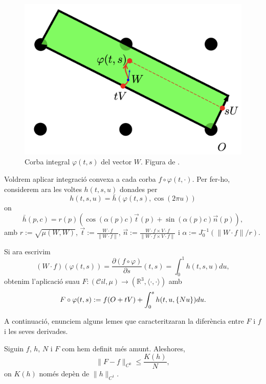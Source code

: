 \begin{figure}[htbp]
    \centering
    \includegraphics[height=0.33\textwidth]{W.png}
    \caption{Corba integral $\varphi(t,s)$ del vector $W$. Figura de \citet{borrelli2013}.}
    \label{fig:vuitena_foto}
\end{figure}

Voldrem aplicar integració convexa a cada corba $f\circ\varphi(t,\cdot)$. Per fer-ho, considerem ara les voltes $h(t,s,u)$ donades per
\begin{equation}
    h(t,s,u) = \bar h(\varphi(t,s), \cos(2\pi u))
\end{equation}
on 
\begin{equation*}
    \bar h(p, c) = r(p)\left( \cos(\alpha(p)c)\vec t(p) + \sin(\alpha(p)c)\vec n(p) \right),
\end{equation*}
amb $r:=\sqrt{\mu(W,W)}$, $\vec t := \frac{W\cdot f}{\|W\cdot f\|}$, $\vec n := \frac{W\cdot f\times V\cdot f}{\|W\cdot f\times V\cdot f\|}$ i $\alpha:= J_0^{-1}(\|W\cdot f\|/r)$.

Si ara escrivim 
\begin{equation*}
    (W\cdot f)(\varphi(t,s)) = \frac{\partial(f\circ\varphi)}{\partial s}(t,s)= \int_0^1 h(t,s,u) du,
\end{equation*}
obtenim l'aplicació suau $F:(\mathcal Cil, \mu)\to(\mathbb R^3, \langle\cdot, \cdot\rangle)$ amb
\begin{equation}
    F\circ\varphi(t,s) := f(O+tV) + \int_0^s h(t,u,\{Nu\}) du.
\end{equation}

A continuació, enunciem alguns lemes que caracteritzaran la diferència entre $F$ i $f$ i les seves derivades.

\begin{lema}
    \label{lema:lema2}
    Siguin $f$, $h$, $N$ i $F$ com hem definit més amunt. Aleshores,
    \begin{equation*}
        \|F-f\|_{C^0} \le \frac{K(h)}{N},
    \end{equation*}
    on $K(h)$ només depèn de $\|h\|_{C^1}$.
\end{lema}

